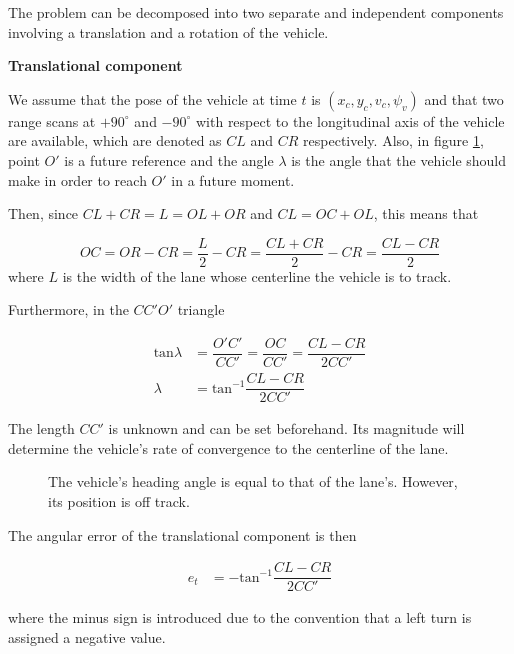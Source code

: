 The problem can be decomposed into two separate and independent
components involving a translation and a rotation of the vehicle.
\newline

\textbf{Translational component}
\newline

We assume that the pose of the vehicle at time $t$ is
$(x_c, y_c, v_c, \psi_v)$ and that two range scans at $+90^\circ$ and
$-90^\circ$ with respect to the longitudinal axis of the
vehicle are available, which are denoted as $CL$ and $CR$ respectively. Also,
in figure \ref{fig:centerline_pid_translation}, point $O'$ is a future
reference and the angle $\lambda$ is the angle that the vehicle should
make in order to reach $O'$ in a future moment.

Then, since $CL + CR = L = OL + OR$ and $CL = OC + OL$, this means that

\begin{equation}
  OC = OR - CR = \dfrac{L}{2} - CR = \dfrac{CL + CR}{2} - CR = \dfrac{CL-CR}{2}
\end{equation}
where $L$ is the width of the lane whose centerline the vehicle is to track.

Furthermore, in the $CC'O'$ triangle

\begin{align}
  \text{tan}\lambda &= \dfrac{O'C'}{CC'} = \dfrac{OC}{CC'} = \dfrac{CL-CR}{2CC'} \\
  \lambda &= \text{tan}^{-1}\dfrac{CL-CR}{2CC'}
\end{align}

The length $CC'$ is unknown and can be set beforehand. Its magnitude
will determine the vehicle's rate of convergence to the centerline of the
lane.

\begin{figure}[H]\centering
  \scalebox{1}{}
  \caption{The vehicle's heading angle is equal to that of the lane's.
    However, its position is off track.}
  \label{fig:centerline_pid_translation}
\end{figure}

The angular error of the translational component is then

\begin{align}
  e_t &= -\text{tan}^{-1}\dfrac{CL-CR}{2CC'}
\end{align}

where the minus sign is introduced due to the
convention that a left turn is assigned a negative value.

